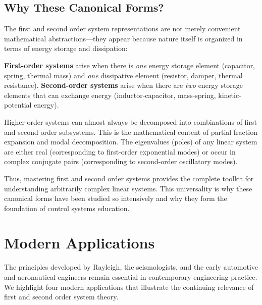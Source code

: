 \subsection{Why These Canonical Forms?}

The first and second order system representations are not merely convenient mathematical abstractions---they appear because nature itself is organized in terms of energy storage and dissipation:

\begin{keyconceptbox}
\textbf{First-order systems} arise when there is \textit{one} energy storage element (capacitor, spring, thermal mass) and \textit{one} dissipative element (resistor, damper, thermal resistance). \textbf{Second-order systems} arise when there are \textit{two} energy storage elements that can exchange energy (inductor-capacitor, mass-spring, kinetic-potential energy).
\end{keyconceptbox}

Higher-order systems can almost always be decomposed into combinations of first and second order subsystems. This is the mathematical content of partial fraction expansion and modal decomposition. The eigenvalues (poles) of any linear system are either real (corresponding to first-order exponential modes) or occur in complex conjugate pairs (corresponding to second-order oscillatory modes).

Thus, mastering first and second order systems provides the complete toolkit for understanding arbitrarily complex linear systems. This universality is why these canonical forms have been studied so intensively and why they form the foundation of control systems education.

\section{Modern Applications}

The principles developed by Rayleigh, the seismologists, and the early automotive and aeronautical engineers remain essential in contemporary engineering practice. We highlight four modern applications that illustrate the continuing relevance of first and second order system theory.

